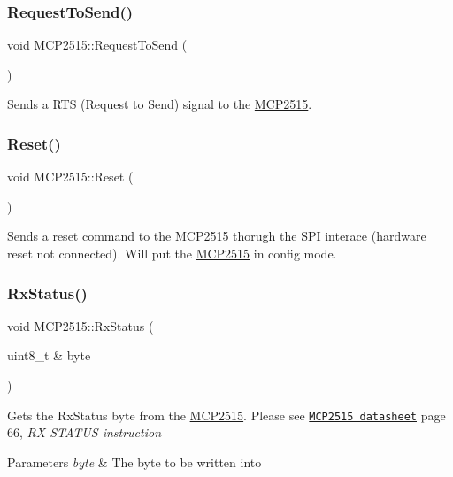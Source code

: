 \subsubsection{\texorpdfstring{Request\+To\+Send()}{RequestToSend()}}
{\footnotesize\ttfamily void M\+C\+P2515\+::\+Request\+To\+Send (\begin{DoxyParamCaption}{ }\end{DoxyParamCaption})\hspace{0.3cm}{\ttfamily [private]}}

Sends a R\+TS (Request to Send) signal to the \hyperlink{class_m_c_p2515}{M\+C\+P2515}. \hypertarget{class_m_c_p2515_aa4d4138b984dc87116cf72ae104acb70}{}\label{class_m_c_p2515_aa4d4138b984dc87116cf72ae104acb70} 
\subsubsection{\texorpdfstring{Reset()}{Reset()}}
{\footnotesize\ttfamily void M\+C\+P2515\+::\+Reset (\begin{DoxyParamCaption}{ }\end{DoxyParamCaption})\hspace{0.3cm}{\ttfamily [private]}}

Sends a reset command to the \hyperlink{class_m_c_p2515}{M\+C\+P2515} thorugh the \hyperlink{namespace_s_p_i}{S\+PI} interace (hardware reset not connected). Will put the \hyperlink{class_m_c_p2515}{M\+C\+P2515} in config mode. \hypertarget{class_m_c_p2515_af6853f82074a0be19d5a0516a959515e}{}\label{class_m_c_p2515_af6853f82074a0be19d5a0516a959515e} 
\subsubsection{\texorpdfstring{Rx\+Status()}{RxStatus()}}
{\footnotesize\ttfamily void M\+C\+P2515\+::\+Rx\+Status (\begin{DoxyParamCaption}\item[{uint8\+\_\+t \&}]{byte }\end{DoxyParamCaption})\hspace{0.3cm}{\ttfamily [private]}}

Gets the Rx\+Status byte from the \hyperlink{class_m_c_p2515}{M\+C\+P2515}. Please see \href{http://ww1.microchip.com/downloads/en/DeviceDoc/21801G.pdf}{\tt M\+C\+P2515 datasheet} page 66, {\itshape RX S\+T\+A\+T\+US instruction} 
\begin{DoxyParams}{Parameters}
{\em byte} & The byte to be written into \\
\hline
\end{DoxyParams}
\hypertarget{class_m_c_p2515_ade69da887eb514530ef5f73c0c3b0130}{}\label{class_m_c_p2515_ade69da887eb514530ef5f73c0c3b0130} 
